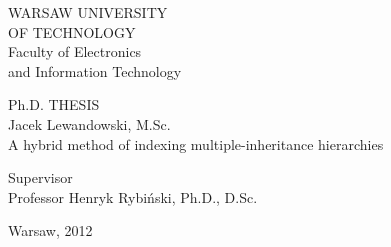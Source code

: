 \begin{titlepage}
  \begin{center}
    \fontsize{28pt}{34pt}\selectfont
      WARSAW UNIVERSITY \\
      OF TECHNOLOGY \\

    \vspace*{.5\baselineskip}
    \fontsize{24pt}{18pt}\selectfont
      Faculty of Electronics\\ and Information Technology

    \vspace*{4\baselineskip}
    \fontsize{32pt}{20pt}\selectfont
      Ph.D. THESIS \\
  
    \vspace*{\baselineskip}
    \fontsize{20pt}{15pt}\selectfont
      Jacek Lewandowski, M.Sc.\\
  
    \vspace*{\baselineskip}
    \fontsize{15pt}{18pt}\selectfont
      A hybrid method of indexing multiple-inheritance hierarchies  \\
  
  \end{center}

  \vspace*{6\baselineskip}
  \begin{flushright}
    \fontsize{13pt}{10pt}\selectfont
      Supervisor\\
      Professor Henryk Rybiński, Ph.D., D.Sc.\\
  \end{flushright}

  \vspace*{4\baselineskip}
  \begin{center}
    Warsaw, 2012
  \end{center}
\end{titlepage}
\setcounter{page}{2}
